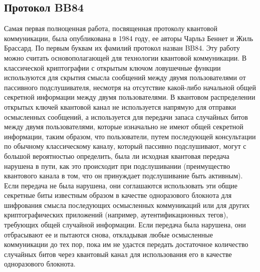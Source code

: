 \subsection{Протокол BB84}\label{sec:ch1/sect2/DVQKD prot/bb84 ch1}
Самая первая полноценная работа, посвященная  протоколу квантовой коммуникации, была опубликована в 1984 году, ее авторы Чарльз Беннет и Жиль Брассард\cite{bennett1984a}. По первым буквам их фамилий протокол назван BB84. Эту работу можно считать основополагающей для технологии квантовой коммуникации. 
\newline В классической  криптографии с открытым ключом ловушечные функции используются для скрытия смысла сообщений между двумя пользователями от пассивного подслушивателя, несмотря на отсутствие какой-либо начальной общей секретной информации между двумя пользователями. В квантовом распределении открытых ключей квантовой канал не используется напрямую для отправки осмысленных сообщений, а используется для передачи запаса случайных битов между двумя пользователями, которые изначально не имеют общей секретной информации, таким образом, что пользователи, путем последующей консультации по обычному классическому каналу, который  пассивно подслушивают, могут с большой вероятностью определить, была ли исходная квантовая передача нарушена в пути, как это происходит при подслушивании (преимущество квантового канала в том, что он принуждает подслушивание быть активным). Если передача не была нарушена, они соглашаются использовать эти общие секретные биты известным образом в качестве одноразового блокнота для шифрования смысла последующих осмысленных коммуникаций или для других криптографических приложений (например, аутентификационных тегов), требующих общей случайной информации. Если передача была нарушена, они отбрасывают ее и пытаются снова, откладывая любые осмысленные коммуникации до тех пор, пока им не удастся передать достаточное количество случайных битов через квантовый канал для использования его в качестве одноразового блокнота.
